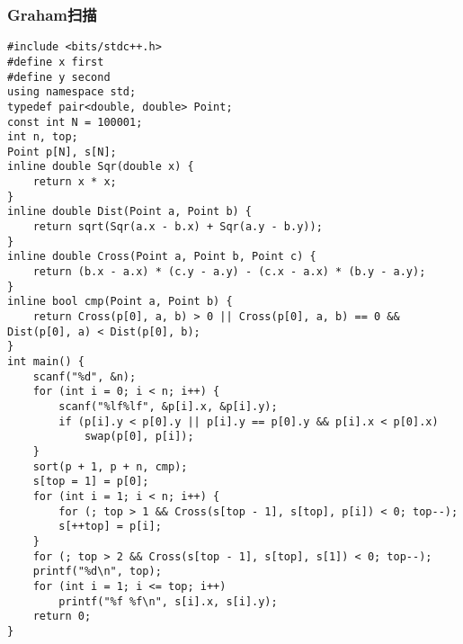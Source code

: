 ﻿\documentclass[a4paper]{article}
\begin{document}
\subsubsection{Graham扫描}
\begin{lstlisting}
#include <bits/stdc++.h>
#define x first
#define y second
using namespace std;
typedef pair<double, double> Point;
const int N = 100001;
int n, top;
Point p[N], s[N];
inline double Sqr(double x) {
    return x * x;
}
inline double Dist(Point a, Point b) {
    return sqrt(Sqr(a.x - b.x) + Sqr(a.y - b.y));
}
inline double Cross(Point a, Point b, Point c) {
    return (b.x - a.x) * (c.y - a.y) - (c.x - a.x) * (b.y - a.y);
}
inline bool cmp(Point a, Point b) {
    return Cross(p[0], a, b) > 0 || Cross(p[0], a, b) == 0 && Dist(p[0], a) < Dist(p[0], b);
}
int main() {
    scanf("%d", &n);
    for (int i = 0; i < n; i++) {
        scanf("%lf%lf", &p[i].x, &p[i].y);
        if (p[i].y < p[0].y || p[i].y == p[0].y && p[i].x < p[0].x)
            swap(p[0], p[i]);
    }
    sort(p + 1, p + n, cmp);
    s[top = 1] = p[0];
    for (int i = 1; i < n; i++) {
        for (; top > 1 && Cross(s[top - 1], s[top], p[i]) < 0; top--);
        s[++top] = p[i];
    }
    for (; top > 2 && Cross(s[top - 1], s[top], s[1]) < 0; top--);
    printf("%d\n", top);
    for (int i = 1; i <= top; i++)
        printf("%f %f\n", s[i].x, s[i].y);
    return 0;
}
\end{lstlisting}
\end{document}
